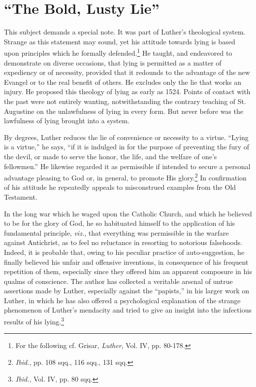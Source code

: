 \section{“The Bold, Lusty Lie”}

This subject demands a special note. It was part of Luther’s theological
system. Strange as this statement may sound, yet his attitude
towards lying is based upon principles which he formally defended.\footnote
{For the following cf. Grisar, \textit{Luther}, Vol. IV, pp. 80-178.}
He taught, and endeavored to demonstrate on diverse occasions, that
lying is permitted as a matter of expediency or of necessity, provided
that it redounds to the advantage of the new Evangel or to
the real benefit of others. He excludes only the lie that works an
injury. He proposed this theology of lying as early as 1524. Points
of contact with the past were not entirely wanting, notwithstanding
the contrary teaching of St. Augustine on the unlawfulness of lying
in every form. But never before was the lawfulness of lying brought
into a system.

By degrees, Luther reduces the lie of convenience or necessity to a
virtue. “Lying is a virtue,” he says, “if it is indulged in for the purpose
of preventing the fury of the devil, or made to serve the honor,
the life, and the welfare of one’s fellowmen.” He likewise regarded it
as permissible if intended to secure a personal advantage pleasing to
God or, in general, to promote His glory.\footnote{\textit{Ibid.}, pp. 108 sqq., 116 sqq., 131 sqq.}
 In confirmation of his
attitude he repeatedly appeals to misconstrued examples from the Old
Testament.

In the long war which he waged upon the Catholic Church, and
which he believed to be for the glory of God, he so habituated himself
to the application of his fundamental principle, \textit{viz.}, that everything
was permissible in the warfare against Antichrist, as to feel no reluctance
in resorting to notorious falsehoods. Indeed, it is probable that,
owing to his peculiar practice of auto-suggestion, he finally believed
his unfair and offensive inventions, in consequence of his frequent
repetition of them, especially since they offered him an apparent composure
in his qualms of conscience. The author has collected a veritable
arsenal of untrue assertions made by Luther, especially against the
“papists,” in his larger work on Luther, in which he has also offered a
psychological explanation of the strange phenomenon of Luther’s
mendacity and tried to give an insight into the infectious results of
his lying.\footnote{\textit{Ibid.}, Vol. IV, pp. 80 sqq.}
